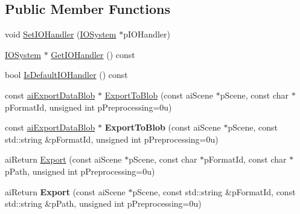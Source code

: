 \subsection*{Public Member Functions}
\begin{DoxyCompactItemize}
\item 
void \hyperlink{class_assimp_1_1_exporter_a054201cf78fa352b1281ea8b484f6e3a}{Set\+I\+O\+Handler} (\hyperlink{class_assimp_1_1_i_o_system}{I\+O\+System} $\ast$p\+I\+O\+Handler)
\item 
\hyperlink{class_assimp_1_1_i_o_system}{I\+O\+System} $\ast$ \hyperlink{class_assimp_1_1_exporter_a736d66db1a94de7df6eb978975e8d47a}{Get\+I\+O\+Handler} () const 
\item 
bool \hyperlink{class_assimp_1_1_exporter_a9ae1196f04cceb0d35fde6229ba41d0b}{Is\+Default\+I\+O\+Handler} () const 
\item 
const \hyperlink{structai_export_data_blob}{ai\+Export\+Data\+Blob} $\ast$ \hyperlink{class_assimp_1_1_exporter_a390c0950a3a164fc431e0797ae1a84d1}{Export\+To\+Blob} (const ai\+Scene $\ast$p\+Scene, const char $\ast$p\+Format\+Id, unsigned int p\+Preprocessing=0u)
\item 
const \hyperlink{structai_export_data_blob}{ai\+Export\+Data\+Blob} $\ast$ {\bfseries Export\+To\+Blob} (const ai\+Scene $\ast$p\+Scene, const std\+::string \&p\+Format\+Id, unsigned int p\+Preprocessing=0u)\hypertarget{class_assimp_1_1_exporter_a02aa8c453879dc9365e7ec4d1e8d7413}{}\label{class_assimp_1_1_exporter_a02aa8c453879dc9365e7ec4d1e8d7413}

\item 
ai\+Return \hyperlink{class_assimp_1_1_exporter_ab8edf249172567a78ca302278a415e35}{Export} (const ai\+Scene $\ast$p\+Scene, const char $\ast$p\+Format\+Id, const char $\ast$p\+Path, unsigned int p\+Preprocessing=0u)
\item 
ai\+Return {\bfseries Export} (const ai\+Scene $\ast$p\+Scene, const std\+::string \&p\+Format\+Id, const std\+::string \&p\+Path, unsigned int p\+Preprocessing=0u)\hypertarget{class_assimp_1_1_exporter_aec681d38ca0bef85a015c64831a3566a}{}\label{class_assimp_1_1_exporter_aec681d38ca0bef85a015c64831a3566a}


\end{DoxyCompactItemize}
